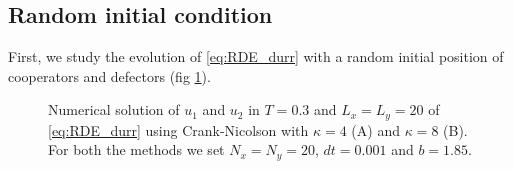 \subsection{Random initial condition}

First, we study the evolution of \ref{eq:RDE_durr} with a random
initial position of cooperators and defectors (fig \ref{fig:rand-2}). 

\begin{figure}
\caption{\label{fig:rand-2}Numerical solution of $u_{1}$ and $u_{2}$ in
$T=0.3$ and $L_{x}=L_{y}=20$ of \ref{eq:RDE_durr} using Crank-Nicolson
with $\kappa=4$ (A) and $\kappa=8$ (B). For both the methods we
set $N_{x}=N_{y}=20$, $dt=0.001$ and $b=1.85$.}
\end{figure}


